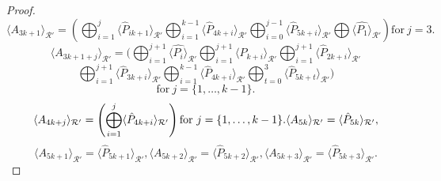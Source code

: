 \documentclass{amsart}
\theoremstyle{definition}
\theoremstyle{remark}
\numberwithin{equation}{section}
\begin{document}
\begin{proof}
       $$ \langle  A_{3k+1} \rangle_{\mathcal{R}'} =  \left( \bigoplus_{i=1}^{j} \langle \hat{P}_{ik+1} \rangle_{\mathcal{R}'} \bigoplus_{i=1}^{k-1} \langle \hat{P}_{4k+i} \rangle_{\mathcal{R}'} \bigoplus_{i=0}^{j-1} \langle \hat{P}_{5k+i} \rangle_{\mathcal{R}'} \bigoplus \langle \hat{P_{1}} \rangle_{\mathcal{R}'}  \right) \text{for} ~ j =3. $$ 
       $$ \langle  A_{3k+1+j} \rangle_{\mathcal{R}'} = ( \bigoplus_{i=1}^{j+1} \langle \hat{P_{i}} \rangle_{\mathcal{R}'} \bigoplus_{i=1}^{j+1} \langle \hat{P}_{k+i} \rangle_{\mathcal{R}'}  \bigoplus_{i=1}^{j+1} \langle \hat{P}_{2k+i} \rangle_{\mathcal{R}'} $$ $$\bigoplus_{i=1}^{j+1} \langle \hat{P}_{3k+i} \rangle_{\mathcal{R}'} \bigoplus_{i=1}^{k-1} \langle \hat{P}_{4k+i} \rangle_{\mathcal{R}'} \bigoplus_{t=0}^{3} \langle \hat{P}_{5k+t} \rangle_{\mathcal{R}'} )$$ $$ \text{for} ~ j = \{1,\dots,k-1\}. $$ 
       $$ \langle  A_{4k+j} \rangle_{\mathcal{R}'} = \left( \bigoplus_{i=1}^{j} \langle \hat{P}_{4k+i} \rangle_{\mathcal{R}'} \right) \text{for} ~ j = \{1,\dots,k-1\}.\langle  A_{5k} \rangle_{\mathcal{R}'} \\ = \langle \hat{P}_{5k} \rangle_{\mathcal{R}'}, $$  $$ \langle  A_{5k+1} \rangle_{\mathcal{R}'}= \langle \hat{P}_{5k+1} \rangle_{\mathcal{R}'} ,\langle  A_{5k+2} \rangle_{\mathcal{R}'} = \langle \hat{P}_{5k+2} \rangle_{\mathcal{R}'} ,\langle  A_{5k+3} \rangle_{\mathcal{R}'} =  \langle \hat{P}_{5k+3} \rangle_{\mathcal{R}'}.$$
    

\end{proof}
\end{document}
